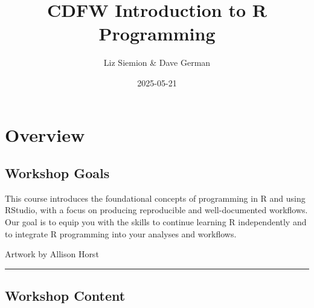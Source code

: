 \documentclass[
]{book}
\title{CDFW Introduction to R Programming}
\author{Liz Siemion \& Dave German}
\date{2025-05-21}
\begin{document}
\maketitle

{
\setcounter{tocdepth}{1}
\tableofcontents
}
\chapter{Overview}\label{overview}

\section{Workshop Goals}\label{workshop-goals}

This course introduces the foundational concepts of programming in R and using RStudio, with a focus on producing reproducible and well-documented workflows. Our goal is to equip you with the skills to continue learning R independently and to integrate R programming into your analyses and workflows.

Artwork by Allison Horst

\begin{center}\rule{0.5\linewidth}{0.5pt}\end{center}

\section{Workshop Content}\label{workshop-content}
\end{document}
